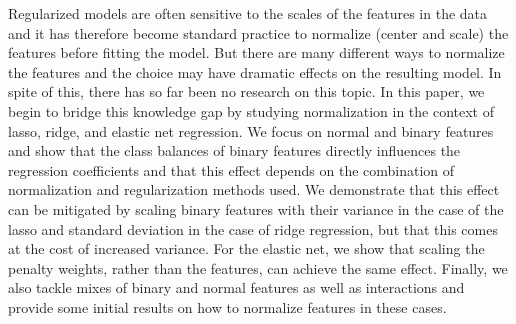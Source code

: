 Regularized models are often sensitive to the scales of the features in the data and it has
therefore become standard practice to normalize (center and scale) the features before
fitting the model. But there are many different ways to normalize the features and the
choice may have dramatic effects on the resulting model. In spite of this, there has so far
been no research on this topic. In this paper, we begin to bridge this knowledge gap by
studying normalization in the context of lasso, ridge, and elastic net regression. We focus
on normal and binary features and show that the class balances of binary features directly
influences the regression coefficients and that this effect depends on the combination of
normalization and regularization methods used. We demonstrate that this effect can be
mitigated by scaling binary features with their variance in the case of the lasso and
standard deviation in the case of ridge regression, but that this comes at the cost of
increased variance. For the elastic net, we show that scaling the penalty weights, rather
than the features, can achieve the same effect. Finally, we also tackle mixes of binary and
normal features as well as interactions and provide some initial results on how to
normalize features in these cases.
